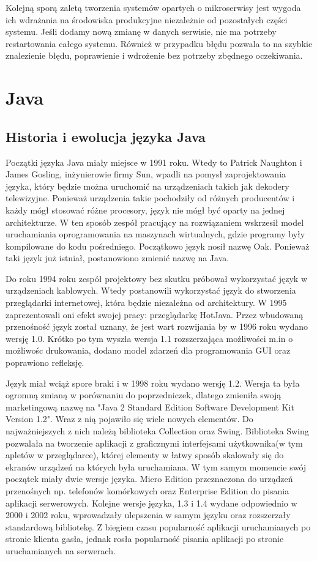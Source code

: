 Kolejną sporą zaletą tworzenia systemów opartych o mikroserwisy jest wygoda ich wdrażania na środowiska produkcyjne niezależnie od pozostałych części systemu. Jeśli dodamy nową zmianę w danych serwisie, nie ma potrzeby restartowania całego systemu. Również w przypadku błędu pozwala to na szybkie znalezienie błędu, poprawienie i wdrożenie bez potrzeby zbędnego oczekiwania. 

\section{Java}
\subsection{Historia i ewolucja języka Java}
Początki języka Java miały miejsce w 1991 roku. Wtedy to Patrick Naughton i James Gosling, inżynierowie firmy Sun,  wpadli na pomysł zaprojektowania języka, który będzie można uruchomić na urządzeniach takich jak dekodery telewizyjne\cite{java8}. Ponieważ urządzenia takie pochodziły od różnych producentów i każdy mógł stosować różne procesory, język nie mógł być oparty na jednej architekturze. W ten sposób zespół pracujący na rozwiązaniem wskrzesił model uruchamiania oprogramowania na maszynach wirtualnych, gdzie programy były kompilowane do kodu pośredniego.  
Początkowo język nosił nazwę Oak. Ponieważ taki język już istniał, postanowiono zmienić nazwę na Java.

Do roku 1994 roku zespół projektowy bez skutku próbował wykorzystać język w urządzeniach kablowych. Wtedy postanowili wykorzystać język do stworzenia przeglądarki internetowej, która będzie niezależna od architektury. W 1995 zaprezentowali oni efekt swojej pracy: przeglądarkę HotJava. Przez wbudowaną przenośność język został uznany, że jest wart rozwijania by w 1996 roku wydano wersję 1.0. Krótko po tym wyszła wersja 1.1 rozszerzająca możliwości m.in o możliwośc drukowania, dodano model zdarzeń dla programowania GUI oraz poprawiono refleksję.

Język miał wciąż spore braki i w 1998 roku wydano wersję 1.2. Wersja ta była ogromną zmianą w porównaniu do poprzedniczek, dlatego zmieniła swoją marketingową nazwę na "Java 2 Standard Edition Software Development Kit Version 1.2". Wraz z nią pojawiło się wiele nowych elementów. Do najważniejszych z nich należą biblioteka Collection oraz Swing. Biblioteka Swing pozwalała na tworzenie aplikacji z graficznymi interfejsami użytkownika(w tym apletów w przeglądarce), której elementy w łatwy sposób skalowały się do ekranów urządzeń na których była uruchamiana. W tym samym momencie swój początek miały dwie wersje języka. Micro Edition przeznaczona do urządzeń przenośnych np. telefonów komórkowych oraz Enterprise Edition do pisania aplikacji serwerowych. Kolejne wersje języka, 1.3 i 1.4 wydane odpowiednio w 2000 i 2002 roku, wprowadzały ulepszenia w samym języku oraz rozszerzały standardową bibliotekę. Z biegiem czasu popularność aplikacji uruchamianych po stronie klienta gasła, jednak rosła popularność pisania aplikacji po stronie uruchamianych na serwerach.

